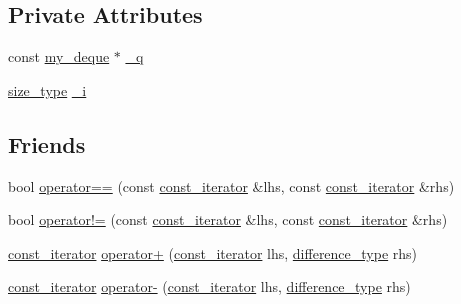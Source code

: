 \subsection*{Private Attributes}
\begin{DoxyCompactItemize}
\item 
const \hyperlink{classmy__deque}{my\-\_\-deque} $\ast$ \hyperlink{classmy__deque_1_1const__iterator_a9bb01f756f5c5e283d8d83d3fcae876a}{\-\_\-q}
\item 
\hyperlink{classmy__deque_a61e5e5317fe72a381ce4d45f09544b02}{size\-\_\-type} \hyperlink{classmy__deque_1_1const__iterator_a96e9c925cd20cfbbd18b9f5891bee5ff}{\-\_\-i}
\end{DoxyCompactItemize}
\subsection*{Friends}
\begin{DoxyCompactItemize}
\item 
bool \hyperlink{classmy__deque_1_1const__iterator_a772a728ee48f5cb8904aaae842b0eb82}{operator==} (const \hyperlink{classmy__deque_1_1const__iterator}{const\-\_\-iterator} \&lhs, const \hyperlink{classmy__deque_1_1const__iterator}{const\-\_\-iterator} \&rhs)
\item 
bool \hyperlink{classmy__deque_1_1const__iterator_a12d66edf831aeec4957931d7f7945d90}{operator!=} (const \hyperlink{classmy__deque_1_1const__iterator}{const\-\_\-iterator} \&lhs, const \hyperlink{classmy__deque_1_1const__iterator}{const\-\_\-iterator} \&rhs)
\item 
\hyperlink{classmy__deque_1_1const__iterator}{const\-\_\-iterator} \hyperlink{classmy__deque_1_1const__iterator_ab6ce7b11eff6ef34762c30e4e96a86a0}{operator+} (\hyperlink{classmy__deque_1_1const__iterator}{const\-\_\-iterator} lhs, \hyperlink{classmy__deque_1_1const__iterator_abe3b655aa980c8a12ba486058464c91d}{difference\-\_\-type} rhs)
\item 
\hyperlink{classmy__deque_1_1const__iterator}{const\-\_\-iterator} \hyperlink{classmy__deque_1_1const__iterator_a41934331896eac6321161ff28c21fb29}{operator-\/} (\hyperlink{classmy__deque_1_1const__iterator}{const\-\_\-iterator} lhs, \hyperlink{classmy__deque_1_1const__iterator_abe3b655aa980c8a12ba486058464c91d}{difference\-\_\-type} rhs)
\end{DoxyCompactItemize}


